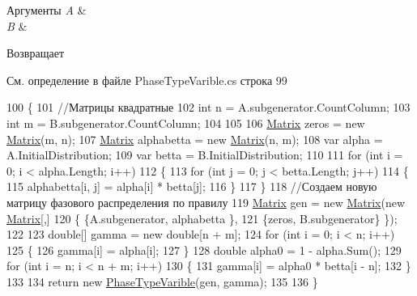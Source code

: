 \begin{DoxyParams}{Аргументы}
{\em A} & \\
\hline
{\em B} & \\
\hline
\end{DoxyParams}
\begin{DoxyReturn}{Возвращает}

\end{DoxyReturn}


См. определение в файле Phase\+Type\+Varible.\+cs строка 99


\begin{DoxyCode}
100         \{
101             \textcolor{comment}{//Матрицы квадратные }
102             \textcolor{keywordtype}{int} n = A.subgenerator.CountColumn;
103             \textcolor{keywordtype}{int} m = B.subgenerator.CountColumn;
104 
105 
106             \hyperlink{class_b_l_a_s_1_1_matrix}{Matrix} zeros = \textcolor{keyword}{new} \hyperlink{class_b_l_a_s_1_1_matrix}{Matrix}(m, n);
107             \hyperlink{class_b_l_a_s_1_1_matrix}{Matrix} alphabetta = \textcolor{keyword}{new} \hyperlink{class_b_l_a_s_1_1_matrix}{Matrix}(n, m);
108             var alpha = A.InitialDistribution;
109             var betta = B.InitialDistribution;
110 
111             \textcolor{keywordflow}{for} (\textcolor{keywordtype}{int} i = 0; i < alpha.Length; i++)
112             \{
113                 \textcolor{keywordflow}{for} (\textcolor{keywordtype}{int} j = 0; j < betta.Length; j++)
114                 \{
115                     alphabetta[i, j] = alpha[i] * betta[j];
116                 \}
117             \}
118             \textcolor{comment}{//Создаем новую матрицу фазового распределения по правилу }
119             \hyperlink{class_b_l_a_s_1_1_matrix}{Matrix} gen = \textcolor{keyword}{new} \hyperlink{class_b_l_a_s_1_1_matrix}{Matrix}(\textcolor{keyword}{new} \hyperlink{class_b_l_a_s_1_1_matrix}{Matrix}[,]
120             \{ \{A.subgenerator, alphabetta \},
121             \{zeros, B.subgenerator\} \});
122 
123             \textcolor{keywordtype}{double}[] gamma = \textcolor{keyword}{new} \textcolor{keywordtype}{double}[n + m];
124             \textcolor{keywordflow}{for} (\textcolor{keywordtype}{int} i = 0; i < n; i++)
125             \{
126                 gamma[i] = alpha[i];
127             \}
128             \textcolor{keywordtype}{double} alpha0 = 1 - alpha.Sum();
129             \textcolor{keywordflow}{for} (\textcolor{keywordtype}{int} i = n; i < n + m; i++)
130             \{
131                 gamma[i] = alpha0 * betta[i - n];
132             \}
133 
134             \textcolor{keywordflow}{return} \textcolor{keyword}{new} \hyperlink{class_phase_type_distribution_1_1_phase_type_varible_ab89c5d81e5cff2f95414f68cf622a773}{PhaseTypeVarible}(gen, gamma);
135 
136         \}
\end{DoxyCode}
